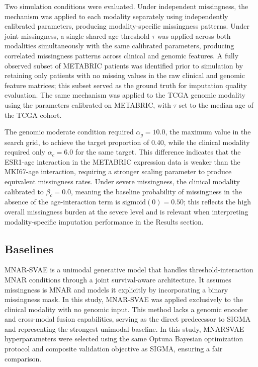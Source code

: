 \documentclass[final,3p,times,authoryear]{elsarticle}
\begin{document}
Two simulation conditions were evaluated. Under independent missingness, the mechanism was applied to each modality separately using independently calibrated parameters, producing modality-specific missingness patterns. Under joint missingness, a single shared age threshold $\tau$ was applied across both modalities simultaneously with the same calibrated parameters, producing correlated missingness patterns across clinical and genomic features. A fully observed subset of METABRIC patients was identified prior to simulation by retaining only patients with no missing values in the raw clinical and genomic feature matrices; this subset served as the ground truth for imputation quality evaluation. The same mechanism was applied to the TCGA genomic modality using the parameters calibrated on METABRIC, with $\tau$ set to the median age of the TCGA cohort.

The genomic moderate condition required $\alpha_g = 10.0$, the maximum value in the search grid, to achieve the target proportion of 0.40, while the clinical modality required only $\alpha_c = 6.0$ for the same target. This difference indicates that the ESR1-age interaction in the METABRIC expression data is weaker than the MKI67-age interaction, requiring a stronger scaling parameter to produce equivalent missingness rates. Under severe missingness, the clinical modality calibrated to $\beta_c = 0.0$, meaning the baseline probability of missingness in the absence of the age-interaction term is $\text{sigmoid}(0) = 0.50$; this reflects the high overall missingness burden at the severe level and is relevant when interpreting modality-specific imputation performance in the Results section.

\subsection{Baselines}

MNAR-SVAE \citep{mnarsvae} is a unimodal generative model that handles threshold-interaction MNAR conditions through a joint survival-aware architecture. It assumes missingness is MNAR and models it explicitly by incorporating a binary missingness mask. In this study, MNAR-SVAE was applied exclusively to the clinical modality with no genomic input. This method lacks a genomic encoder and cross-modal fusion capabilities, serving as the direct predecessor to SIGMA and representing the strongest unimodal baseline. In this study, MNARSVAE hyperparameters were selected using the same Optuna Bayesian optimization protocol and composite validation objective as SIGMA, ensuring a fair comparison.
\end{document}
